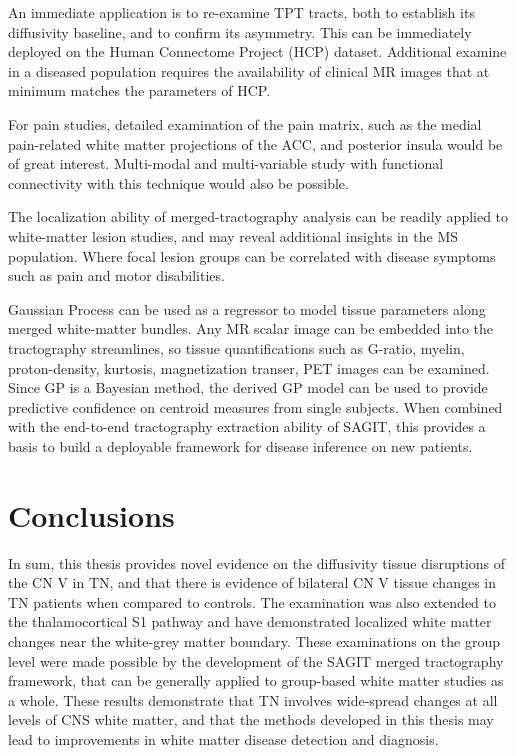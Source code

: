 An immediate application is to re-examine TPT tracts, both to establish its diffusivity baseline, and to confirm its asymmetry. This can be immediately deployed on the Human Connectome Project (HCP) dataset. Additional examine in a diseased population requires the availability of clinical MR images that at minimum matches the parameters of HCP. 

For pain studies, detailed examination of the pain matrix, such as the medial pain-related white matter projections of the ACC, and posterior insula would be of great interest. Multi-modal and multi-variable study with functional connectivity with this technique would also be possible. 

The localization ability of merged-tractography analysis can be readily applied to white-matter lesion studies, and may reveal additional insights in the MS population. Where focal lesion groups can be correlated with disease symptoms such as pain and motor disabilities. 

Gaussian Process can be used as a regressor to model tissue parameters along merged white-matter bundles. Any MR scalar image can be embedded into the tractography streamlines, so tissue quantifications such as G-ratio, myelin, proton-density, kurtosis, magnetization transer, PET images can be examined. Since GP is a Bayesian method, the derived GP model can be used to provide predictive confidence on centroid measures from single subjects. When combined with the end-to-end tractography extraction ability of SAGIT, this provides a basis to build a deployable framework for disease inference on new patients. 

\section{Conclusions}

In sum, this thesis provides novel evidence on the diffusivity tissue disruptions of the CN V in TN, and that there is evidence of bilateral CN V tissue changes in TN patients when compared to controls. The examination was also extended to the thalamocortical S1 pathway and have demonstrated localized white matter changes near the white-grey matter boundary. These examinations on the group level were made possible by the development of the SAGIT merged tractography framework, that can be generally applied to group-based white matter studies as a whole. These results demonstrate that TN involves wide-spread changes at all levels of CNS white matter, and that the methods developed in this thesis may lead to improvements in white matter disease detection and diagnosis. 



 

